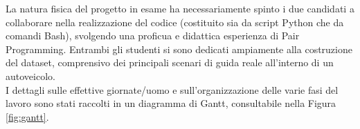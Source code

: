 \documentclass[12pt]{article}
\begin{document}
La natura fisica del progetto in esame ha necessariamente spinto i due candidati a collaborare nella realizzazione del codice (costituito sia da script Python che da comandi Bash), svolgendo una proficua e didattica esperienza di Pair Programming. Entrambi gli studenti si sono dedicati ampiamente alla costruzione del dataset, comprensivo dei principali scenari di guida reale all'interno di un autoveicolo.\\

I dettagli sulle effettive giornate/uomo e sull'organizzazione delle varie fasi del lavoro sono stati raccolti in un diagramma di Gantt, consultabile nella Figura \ref{fig:gantt}.

\newpage


\end{document}
